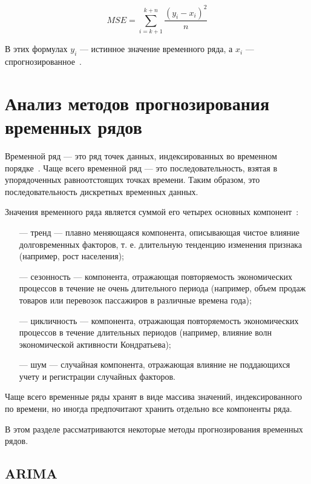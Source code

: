 \documentclass[a4paper, 14pt]{extreport}
\begin{document}
\begin{equation}
	\label{MSE}
	 MSE = \sum \limits _{i=k+1}^{k+n} \frac{(y_{i}-x_{i})^2}{n}
\end{equation}

В этих формулах $y_{i}$ --- истинное значение временного ряда, а $x_{i}$ --- спрогнозированное~\cite{itmo}.

\chapter{Анализ методов прогнозирования временных рядов}

Временной ряд --- это ряд точек данных, индексированных во временном порядке~\cite{deeplearning}. Чаще всего временной 
ряд --- это последовательность, взятая в упорядоченных равноотстоящих точках времени. Таким образом, это
последовательность дискретных временных данных.

Значения временного ряда является суммой его четырех основных компонент~\cite{kizbek}:
\begin{itemize}
	\item[---] тренд --- плавно меняющаяся компонента, описывающая чистое влияние долговременных факторов, т. е. 
	длительную тенденцию изменения признака (например, рост населения);
	\item[---] сезонность --- компонента, отражающая повторяемость экономических процессов в течение не очень 
	длительного периода (например, объем продаж товаров или перевозок пассажиров в различные времена года);
	\item[---] цикличность --- компонента, отражающая повторяемость экономических процессов в течение длительных 
	периодов (например, влияние волн экономической активности Кондратьева);
	\item[---] шум --- случайная компонента, отражающая влияние не поддающихся учету и регистрации случайных факторов.
\end{itemize}

Чаще всего временные ряды хранят в виде массива значений, индексированного по времени, но иногда предпочитают хранить 
отдельно все компоненты ряда.

В этом разделе рассматриваются некоторые методы прогнозирования временных рядов. 

\section{ARIMA}
\end{document}
